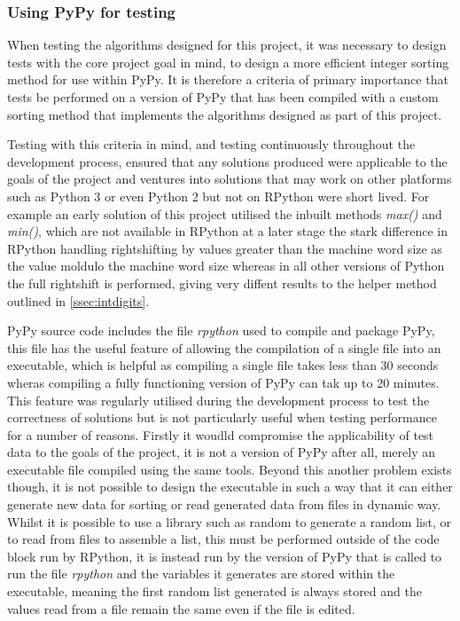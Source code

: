 \documentclass[12pt]{article}
\begin{document}
\subsubsection{Using PyPy for testing}
When testing the algorithms designed for this project, it was necessary to design tests with the core project goal in mind, to design a more efficient integer sorting method for use within PyPy. It is therefore a criteria of primary importance that tests be performed on a version of PyPy that has been compiled with a custom sorting method that implements the algorithms designed as part of this project. 
\par 
Testing with this criteria in mind, and testing continuously throughout the development process, ensured that any solutions produced were applicable to the goals of the project and ventures into solutions that may work on other platforms such as Python 3 or even Python 2 but not on RPython were short lived. For example an early solution of this project utilised the inbuilt methods \textit{max()} and \textit{min()}, which are not available in RPython at a later stage the stark difference in RPython handling rightshifting by values greater than the machine word size as the value moldulo the machine word size whereas in all other versions of Python the full rightshift is performed, giving very diffent results to the helper method outlined in \ref{ssec:intdigits}.
\par 
PyPy source code includes the file \textit{rpython} used to compile and package PyPy, this file has the useful feature of allowing the compilation of a single file into an executable, which is helpful as compiling a single file takes less than 30 seconds wheras compiling a fully functioning version of PyPy can tak up to 20 minutes. This feature was regularly utilised during the development process to test the correctness of solutions but is not particularly useful when testing performance for a number of reasons. Firstly it woudld compromise the applicability of test data to the goals of the project, it is not a version of PyPy after all, merely an executable file compiled using the same tools. Beyond this another problem exists though, it is not possible to design the executable in such a way that it can either generate new data for sorting or read generated data from files in dynamic way. Whilst it is possible to use a library such as random to generate a random list, or to read from files to assemble a list, this must be performed outside of the code block run by RPython, it is instead run by the version of PyPy that is called to run the file \textit{rpython} and the variables it generates are stored within the executable, meaning the first random list generated is always stored and the values read from a file remain the same even if the file is edited.
\pagebreak
\end{document}
